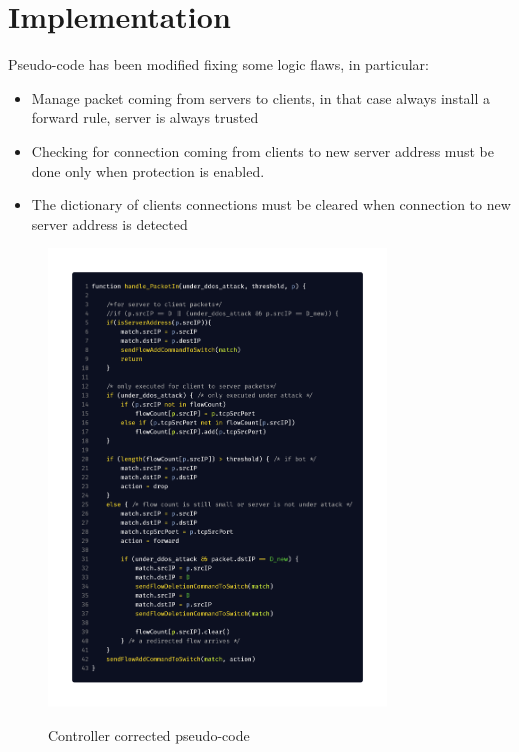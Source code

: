 \chapter{Implementation}
Pseudo-code has been modified fixing some logic flaws, in particular:
\begin{itemize}
	\item Manage packet coming from servers to clients, in that case always install a forward rule, server is always trusted
	\item Checking for connection coming from clients to new server address must be done only when protection is enabled.
	\item The dictionary of clients connections must be cleared when connection to new server address is detected
\end{itemize}

\begin{figure}[H]
\begin{center}
\includegraphics[width=0.8\textwidth]{images/pseudo_code_corrected.png}
\label{fig:pseudocode}
\caption{Controller corrected pseudo-code}
\end{center}
\end{figure}

